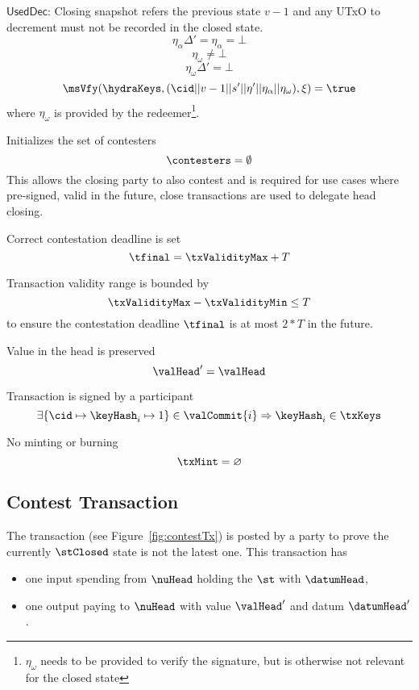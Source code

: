 \begin{menumerate}
\begin{menumerate}
\[	\]
	\item $\mathsf{UsedDec}$: Closing snapshot refers the previous state $v - 1$ and any UTxO to decrement must not be recorded in the closed state.
	  \[
		\eta_\alpha\Delta' = \eta_\alpha = \bot
	  \]
	  \[ 
	    \eta_\omega \neq  \bot
	  \]
	  \[ 
	    \eta_\omega\Delta' = \bot
	  \]
	\[
	  \msVfy(\hydraKeys,(\cid || v - 1 || s' || \eta' || \eta_\alpha || \eta_\omega),\xi) = \true
	\]
	where $\eta_\omega$ is provided by the redeemer\footnote{$\eta_\omega$ needs to be provided to verify the signature, but is otherwise not relevant for the closed state}.
  \end{menumerate}

  \item Initializes the set of contesters
  \[
	\contesters = \emptyset
  \]
  This allows the closing party to also contest and is required for use
  cases where pre-signed, valid in the future, close transactions are
  used to delegate head closing.

  \item Correct contestation deadline is set
  \[
	\tfinal = \txValidityMax + T
  \]
  \item Transaction validity range is bounded by
  \[
	\txValidityMax - \txValidityMin \leq T
  \]
  to ensure the contestation deadline $\tfinal$ is at most $2*T$ in the future.
  \item Value in the head is preserved
  \[
	\valHead' = \valHead
  \]
  \item Transaction is signed by a participant
  \[
	\exists \{\cid \mapsto \keyHash_{i} \mapsto 1\} \in \valCommit{i} \Rightarrow \keyHash_{i} \in \txKeys
  \]
  \item No minting or burning
  \[
	\txMint = \varnothing
  \]
\end{menumerate}

\subsection{Contest Transaction}\label{sec:contest-tx}

The \mtxContest{} transaction (see Figure~\ref{fig:contestTx}) is posted by a
party to prove the currently $\stClosed$ state is not the latest one. This
transaction has
\begin{itemize}
  \item one input spending from $\nuHead$ holding the $\st$ with $\datumHead$,
  \item one output paying to $\nuHead$ with value $\valHead'$ and
  datum $\datumHead'$.
\end{itemize}

